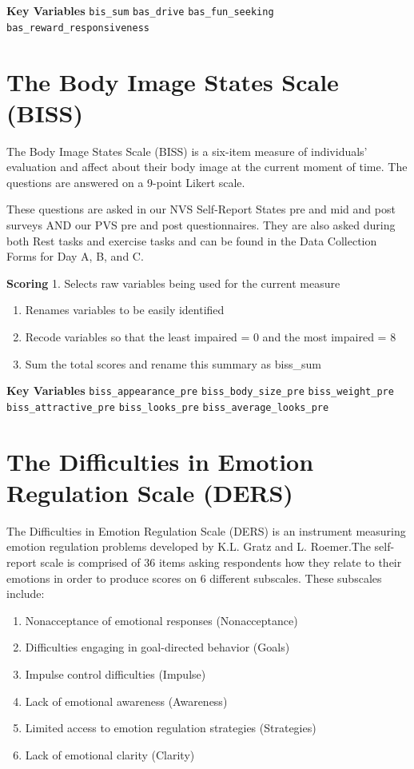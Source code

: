 \documentclass[
]{book}
\providecommand{\tightlist}{%
  \setlength{\itemsep}{0pt}\setlength{\parskip}{0pt}}
\begin{document}
\textbf{Key Variables} \texttt{bis\_sum} \texttt{bas\_drive} \texttt{bas\_fun\_seeking}
\texttt{bas\_reward\_responsiveness}

\section{The Body Image States Scale (BISS)}\label{the-body-image-states-scale-biss}

The Body Image States Scale (BISS) is a six-item measure of individuals'
evaluation and affect about their body image at the current moment of
time. The questions are answered on a 9-point Likert scale.

These questions are asked in our NVS Self-Report States pre and mid and
post surveys AND our PVS pre and post questionnaires. They are also
asked during both Rest tasks and exercise tasks and can be found in the
Data Collection Forms for Day A, B, and C.

\textbf{Scoring} 1. Selects raw variables being used for the current measure

\begin{enumerate}
\def\labelenumi{\arabic{enumi}.}
\setcounter{enumi}{1}
\item
  Renames variables to be easily identified
\item
  Recode variables so that the least impaired = 0 and the most
  impaired = 8
\item
  Sum the total scores and rename this summary as biss\_sum
\end{enumerate}

\textbf{Key Variables} \texttt{biss\_appearance\_pre} \texttt{biss\_body\_size\_pre}
\texttt{biss\_weight\_pre} \texttt{biss\_attractive\_pre} \texttt{biss\_looks\_pre}
\texttt{biss\_average\_looks\_pre}

\section{The Difficulties in Emotion Regulation Scale (DERS)}\label{the-difficulties-in-emotion-regulation-scale-ders}

The Difficulties in Emotion Regulation Scale (DERS) is an instrument
measuring emotion regulation problems developed by K.L. Gratz and L.
Roemer.The self-report scale is comprised of 36 items asking respondents
how they relate to their emotions in order to produce scores on 6
different subscales. These subscales include:

\begin{enumerate}
\def\labelenumi{\arabic{enumi}.}
\tightlist
\item
  Nonacceptance of emotional responses (Nonacceptance)
\item
  Difficulties engaging in goal-directed behavior (Goals)
\item
  Impulse control difficulties (Impulse)
\item
  Lack of emotional awareness (Awareness)
\item
  Limited access to emotion regulation strategies (Strategies)
\item
  Lack of emotional clarity (Clarity)
\end{enumerate}
\end{document}
